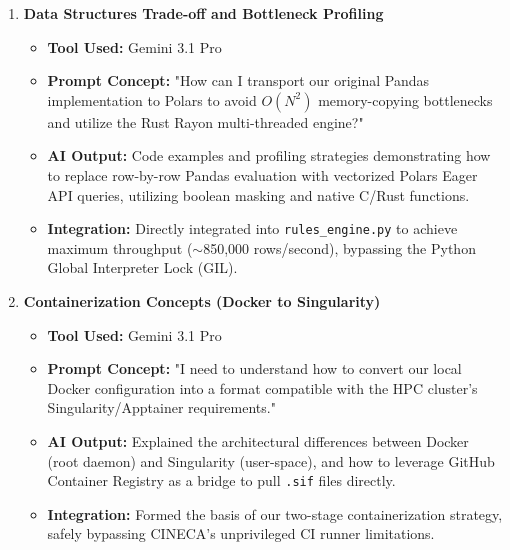 \documentclass[11pt, a4paper]{article}
\begin{document}
\begin{enumerate}[label=\textbf{Topic \arabic*:}, align=left, leftmargin=0.5cm]
    \item \textbf{Data Structures Trade-off and Bottleneck Profiling}
    \begin{itemize}[label={}, leftmargin=0.5cm]
        \item \textbf{Tool Used:} Gemini 3.1 Pro
        \item \textbf{Prompt Concept:} "How can I transport our original Pandas implementation to Polars to avoid $O(N^2)$ memory-copying bottlenecks and utilize the Rust Rayon multi-threaded engine?"
        \item \textbf{AI Output:} Code examples and profiling strategies demonstrating how to replace row-by-row Pandas evaluation with vectorized Polars Eager API queries, utilizing boolean masking and native C/Rust functions.
        \item \textbf{Integration:} Directly integrated into \texttt{rules\_engine.py} to achieve maximum throughput ($\sim$850,000 rows/second), bypassing the Python Global Interpreter Lock (GIL).
    \end{itemize}
    \vspace{0.3cm}

    \item \textbf{Containerization Concepts (Docker to Singularity)}
    \begin{itemize}[label={}, leftmargin=0.5cm]
        \item \textbf{Tool Used:} Gemini 3.1 Pro
        \item \textbf{Prompt Concept:} "I need to understand how to convert our local Docker configuration into a format compatible with the HPC cluster's Singularity/Apptainer requirements."
        \item \textbf{AI Output:} Explained the architectural differences between Docker (root daemon) and Singularity (user-space), and how to leverage GitHub Container Registry as a bridge to pull \texttt{.sif} files directly.
        \item \textbf{Integration:} Formed the basis of our two-stage containerization strategy, safely bypassing CINECA's unprivileged CI runner limitations.
    \end{itemize}
    \vspace{0.3cm}


\end{enumerate}
\end{document}

